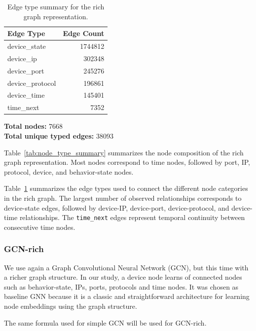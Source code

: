 \documentclass[final,5p,times,twocolumn]{elsarticle}
\begin{document}
\begin{table}[H]
\caption{Edge type summary for the rich graph representation.}
\centering
\small
\begin{tabular}{lr}
\toprule
\textbf{Edge Type} & \textbf{Edge Count} \\
\midrule
device\_state & 1744812 \\
device\_ip & 302348 \\
device\_port & 245276 \\
device\_protocol & 196861 \\
device\_time & 145401 \\
time\_next & 7352 \\
\bottomrule
\end{tabular}
\label{tab:edge_type_summary}
\end{table}

\begin{center}
\textbf{Total nodes:} 7668\\
\textbf{Total unique typed edges:} 38093
\end{center}

Table~\ref{tab:node_type_summary} summarizes the node composition of the rich graph representation. Most nodes correspond to time nodes, followed by port, IP, protocol, device, and behavior-state nodes.

Table~\ref{tab:edge_type_summary} summarizes the edge types used to connect the different node categories in the rich graph. The largest number of observed relationships corresponds to device-state edges, followed by device-IP, device-port, device-protocol, and device-time relationships. The \texttt{time\_next} edges represent temporal continuity between consecutive time nodes.








\subsubsection{GCN-rich}
We use again a Graph Convolutional Neural Network (GCN), but this time with a richer graph structure. In our study, a device node learns of connected nodes such as behavior-state, IPs, ports, protocols and time nodes. It was chosen as baseline GNN because it is a classic and straightforward architecture for learning node embeddings using the graph structure.

The same formula used for simple GCN will be used for GCN-rich.
\end{document}
